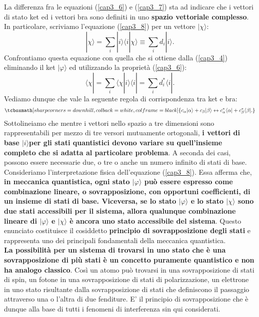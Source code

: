 \documentclass[a4paper,12pt,oneside]{book}
\begin{document}
La differenza fra le equazioni (\ref{cap3_6}) e (\ref{cap3_7}) sta ad indicare che i vettori di stato ket ed i vettori bra sono definiti in uno \textbf{spazio vettoriale complesso}. In particolare, scriviamo l'equazione (\ref{cap3_8}) per un vettore $| \chi\rangle$:
	\begin{equation}
		| \chi \rangle = \sum \limits_{i} | i \rangle \langle i | \chi \rangle \equiv \sum \limits_{i} d_i | i \rangle .
	\end{equation}
Confrontiamo questa equazione con quella che si ottiene dalla (\ref{cap3_4}) eliminando il ket $| \varphi \rangle$ ed utilizzando la proprietà (\ref{cap3_6}):
	\begin{equation}
		\langle \chi | =\sum \limits_{i} \langle \chi | i \rangle \langle i | = \sum \limits_{i} d^*_i \langle i | .
	\end{equation}
Vediamo dunque che vale la seguente regola di corrispondenza tra ket e bra:
	\begin{equation}
		\tcboxmath[sharp corners=downhill, colback=white, colframe=black]{
			c_{\alpha}| \alpha \rangle +c_{\beta} | \beta \rangle  \leftrightarrow c^*_{\alpha}\langle \alpha | +c^*_{\beta}\langle \beta | .
			}
	\end{equation}
Sottolineiamo che mentre i vettori nello spazio a tre dimensioni sono rappresentabili per mezzo di tre versori mutuamente ortogonali, \textbf{i vettori di base $| i \rangle $per gli stati quantistici devono variare su quell'insieme completo che si adatta al particolare problema}. A seconda dei casi, possono essere necessarie due, o tre o anche un numero infinito di stati di base.\\

Consideriamo l'interpretazione fisica dell'equazione (\ref{cap3_8}). Essa afferma che, \textbf{in meccanica quantistica, ogni stato $| \varphi \rangle$ può essere espresso come combinazione lineare, o sovrapposizione, con opportuni coefficienti, di un insieme di stati di base. Viceversa, se lo stato $| \varphi \rangle$ e lo stato $| \chi \rangle$ sono due stati accessibili per il sistema, allora qualunque combinazione lineare di $| \varphi \rangle$ e $| \chi \rangle$ è ancora uno stato accessibile del sistema}. Questo enunciato costituisce il cosiddetto \textbf{principio di sovrapposizione degli stati} e rappresenta uno dei principali fondamentali della meccanica quantistica.\\

\textbf{La possibilità per un sistema di trovarsi in uno stato che è una sovrapposizione di più stati è un concetto puramente quantistico e non ha analogo classico}. Così un atomo può trovarsi in una sovrapposizione di stati di spin, un fotone in una sovrapposizione di stati di polarizzazione, un elettrone in uno stato risultante dalla sovrapposizione di stati che definiscono il passaggio attraverso una o l'altra di due fenditure. E' il principio di sovrapposizione che è dunque alla base di tutti i fenomeni di interferenza sin qui considerati.\\
\end{document}
